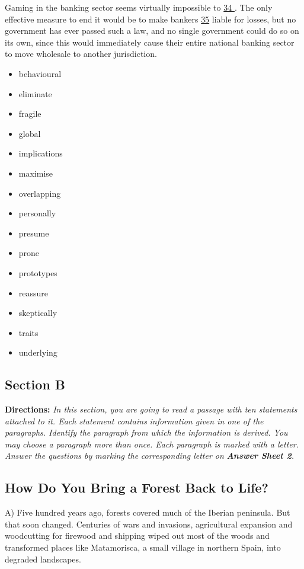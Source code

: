 \documentclass[UTF8,11pt]{ctexart}
\begin{document}
Gaming in the banking sector seems virtually impossible to \uline{34 }. The only effective measure to end it would be to make bankers \uline{35} liable for losses, but no government has ever passed such a law, and no single government could do so on its own, since this would immediately cause their entire national banking sector to move wholesale to another jurisdiction.


\begin{itemize}[leftmargin=2em,itemsep=.2em,topsep=.4em]\item[A.] behavioural
\item[B.] eliminate
\item[C.] fragile
\item[D.] global
\item[E.] implications
\item[F.] maximise
\item[G.] overlapping
\item[H.] personally
\item[I.] presume
\item[J.] prone
\item[K.] prototypes
\item[L.] reassure
\item[M.] skeptically
\item[N.] traits
\item[O.] underlying
\end{itemize}

\subsection*{\textbf{Section B}}


\textbf{Directions:} \textit{In this section, you are going to read a passage with ten statements attached to it. Each statement contains} \textit{information given in one of the paragraphs. Identify the paragraph from which the information is derived. You may} \textit{choose a paragraph more than once. Each paragraph is marked with a letter. Answer the questions by marking the} \textit{corresponding letter on }\textbf{\textit{Answer Sheet 2}}\textit{.}


\subsection*{\textbf{How Do You Bring a Forest Back to Life?}}


A) Five hundred years ago, forests covered much of the Iberian peninsula. But that soon changed. Centuries of wars and invasions, agricultural expansion and woodcutting for firewood and shipping wiped out most of the woods and transformed places like Matamorisca, a small village in northern Spain, into degraded landscapes.
\end{document}
